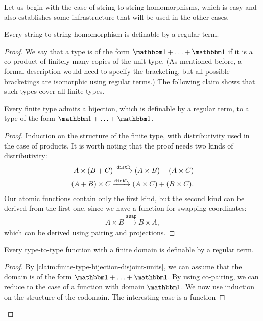 Let us begin with the case of string-to-string homomorphisms, which is easy and also establishes some infrastructure that will be used in the other cases.



\begin{lemma}\label{lem:terms-define-string-homomorphisms}
        Every string-to-string homomorphism is definable by a regular term.
\end{lemma}
\begin{proof}
    We say that a type is of the form $\onetype + \ldots + \onetype$ if it is a co-product of finitely many copies of the unit type.  (As mentioned before, a formal description would need to specify the bracketing, but  all possible bracketings are isomorphic using regular terms.) The following claim shows that such types cover all finite types.
    \begin{claim}\label{claim:finite-type-bijection-disjoint-units}
        Every finite type admits a bijection, which is definable by a regular term, to a type of the form $\onetype + \ldots + \onetype$.
    \end{claim}
    \begin{proof}
        Induction on the structure of the finite type, with distributivity used in the case of products. It is worth noting that the proof needs two  kinds of distributivity:
\begin{align*}
A \times (B + C) \xrightarrow {\mathtt{distR}} (A \times B) + (A \times C)\\
(A + B) \times C \xrightarrow {\mathtt{distL}} (A \times C) + (B \times C).
\end{align*}
    Our atomic functions contain only the first kind, but the second kind can be derived from the first one, since we have a function for swapping coordinates:
\begin{align*}
A \times B \xrightarrow {\mathtt{swap}} B \times A,
\end{align*}
which can be derived using pairing and projections.
    \end{proof}
    \begin{claim}\label{claim:finite-domain-regular-list-function}
        Every type-to-type function with a finite domain  is definable by a regular term.
    \end{claim}
    \begin{proof}
        By \cref{claim:finite-type-bijection-disjoint-units}, we can assume that the domain is of the form $\onetype + \ldots + \onetype$. By using co-pairing, we can reduce to the case of a function with domain $\onetype$. We now use induction on the structure of the codomain. The interesting case is a function 

\end{proof}
\end{proof}
